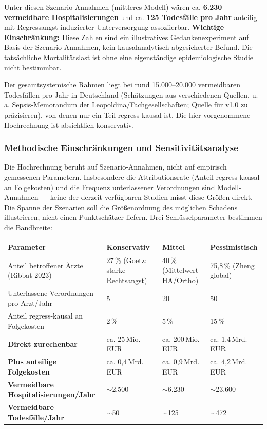 \documentclass{umbruch-position}
\begin{document}
Unter diesen Szenario-Annahmen (mittleres Modell) wären ca. \textbf{6.230 vermeidbare Hospitalisierungen} und ca. \textbf{125 Todesfälle pro Jahr} anteilig mit Regressangst-induzierter Unterversorgung assoziierbar. \textbf{Wichtige Einschränkung:} Diese Zahlen sind ein illustratives Gedankenexperiment auf Basis der Szenario-Annahmen, kein kausalanalytisch abgesicherter Befund. Die tatsächliche Mortalitätslast ist ohne eine eigenständige epidemiologische Studie nicht bestimmbar.

Der gesamtsystemische Rahmen liegt bei rund 15.000--20.000 vermeidbaren Todesfällen pro Jahr in Deutschland (Schätzungen aus verschiedenen Quellen, u.\,a. Sepsis-Memorandum der Leopoldina/Fachgesellschaften; Quelle für v1.0 zu präzisieren), von denen nur ein Teil regress-kausal ist. Die hier vorgenommene Hochrechnung ist absichtlich konservativ.

\subsubsection{Methodische Einschränkungen und Sensitivitätsanalyse}

Die Hochrechnung beruht auf Szenario-Annahmen, nicht auf empirisch gemessenen Parametern. Insbesondere die Attributionsrate (Anteil regress-kausal an Folgekosten) und die Frequenz unterlassener Verordnungen sind Modell-Annahmen --- keine der derzeit verfügbaren Studien misst diese Größen direkt. Die Spanne der Szenarien soll die Größenordnung des möglichen Schadens illustrieren, nicht einen Punktschätzer liefern. Drei Schlüsselparameter bestimmen die Bandbreite:

{\small
\begin{tabularx}{\textwidth}{X X X X}
\toprule
\textbf{Parameter} & \textbf{Konservativ} & \textbf{Mittel} & \textbf{Pessimistisch} \\
\midrule
Anteil betroffener Ärzte (Ribbat 2023) & 27\,\% (Goetz: starke Rechtsangst) & 40\,\% (Mittelwert HA/Ortho) & 75,8\,\% (Zheng global) \\
Unterlassene Verordnungen pro Arzt/Jahr & 5 & 20 & 50 \\
Anteil regress-kausal an Folgekosten & 2\,\% & 5\,\% & 15\,\% \\
\midrule
\textbf{Direkt zurechenbar} & ca. 25\,Mio.\,EUR & ca. 200\,Mio.\,EUR & ca. 1,4\,Mrd.\,EUR \\
\textbf{Plus anteilige Folgekosten} & ca. 0,4\,Mrd.\,EUR & ca. 0,9\,Mrd.\,EUR & ca. 4,2\,Mrd.\,EUR \\
\textbf{Vermeidbare Hospitalisierungen/Jahr} & $\sim$2.500 & $\sim$6.230 & $\sim$23.600 \\
\textbf{Vermeidbare Todesfälle/Jahr} & $\sim$50 & $\sim$125 & $\sim$472 \\
\bottomrule
\end{tabularx}
}
\end{document}
